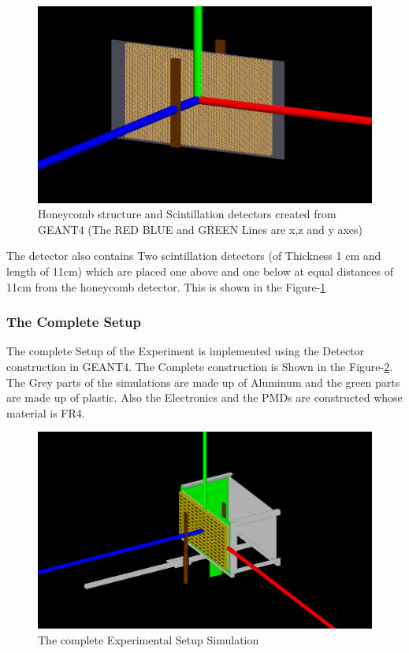 \documentclass{article}
\begin{document}
\begin{multicols}{2}
\begin{figure}[H]
    \centering	
     \includegraphics[width=\columnwidth]{honeycomb1.png}
     \caption{Honeycomb structure and Scintillation detectors created from GEANT4 (The RED BLUE and GREEN Lines are x,z and y axes)}
     \label{honeycomb1}
\end{figure}
The detector also contains Two scintillation detectors (of Thickness 1 cm and length of 11cm)  which are placed one above and one below at equal distances of 11cm
from the honeycomb detector. This is shown in the Figure-\ref{honeycomb1}







\subsubsection{The Complete Setup}

The complete Setup of the Experiment is implemented using the Detector
construction in GEANT4. The Complete construction is Shown in the 
Figure-\ref{combsetup}. The Grey parts of the simulations are made up
of Aluminum and the green parts are made up of plastic. Also the Electronics and
the PMDs are constructed whose material is FR4.

\begin{figure}[H]
    \centering	
     \includegraphics[width=\columnwidth]{combsetup.png}
     \caption{The complete Experimental Setup Simulation}
     \label{combsetup}
\end{figure}






\end{multicols}
\end{document}
